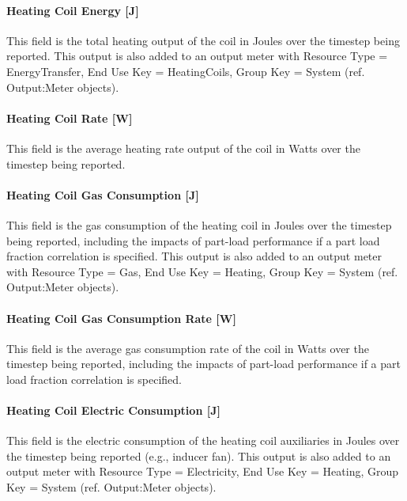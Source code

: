\paragraph{Heating Coil Energy {[}J{]}}\label{heating-coil-energy-j-1}

This field is the total heating output of the coil in Joules over the timestep being reported. This output is also added to an output meter with Resource Type = EnergyTransfer, End Use Key = HeatingCoils, Group Key = System (ref. Output:Meter objects).

\paragraph{Heating Coil Rate {[}W{]}}\label{heating-coil-rate-w}

This field is the average heating rate output of the coil in Watts over the timestep being reported.

\paragraph{Heating Coil Gas Consumption {[}J{]}}\label{heating-coil-gas-consumption-j}

This field is the gas consumption of the heating coil in Joules over the timestep being reported, including the impacts of part-load performance if a part load fraction correlation is specified. This output is also added to an output meter with Resource Type = Gas, End Use Key = Heating, Group Key = System (ref. Output:Meter objects).

\paragraph{Heating Coil Gas Consumption Rate {[}W{]}}\label{heating-coil-gas-consumption-rate-w}

This field is the average gas consumption rate of the coil in Watts over the timestep being reported, including the impacts of part-load performance if a part load fraction correlation is specified.

\paragraph{Heating Coil Electric Consumption {[}J{]}}\label{heating-coil-electric-consumption-j-1}

This field is the electric consumption of the heating coil auxiliaries in Joules over the timestep being reported (e.g., inducer fan). This output is also added to an output meter with Resource Type = Electricity, End Use Key = Heating, Group Key = System (ref. Output:Meter objects).

